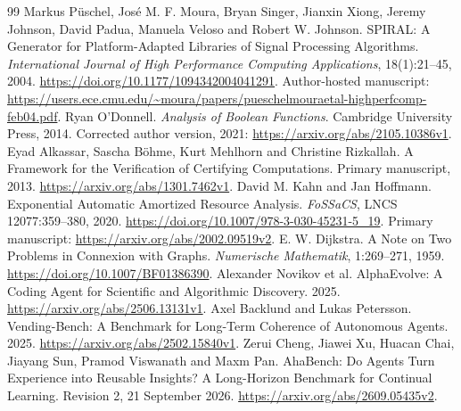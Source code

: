 \documentclass[11pt,letterpaper]{article}
\theoremstyle{definition}\newtheorem{definition}[theorem]{Definition}
\theoremstyle{remark}\newtheorem{remark}[theorem]{Remark}
\begin{document}
\begin{thebibliography}{99}
 Markus P\"uschel, Jos\'e M. F. Moura, Bryan Singer, Jianxin Xiong, Jeremy Johnson, David Padua, Manuela Veloso and Robert W. Johnson. SPIRAL: A Generator for Platform-Adapted Libraries of Signal Processing Algorithms. \emph{International Journal of High Performance Computing Applications}, 18(1):21--45, 2004. \url{https://doi.org/10.1177/1094342004041291}. Author-hosted manuscript: \url{https://users.ece.cmu.edu/~moura/papers/pueschelmouraetal-highperfcomp-feb04.pdf}.
 Ryan O'Donnell. \emph{Analysis of Boolean Functions}. Cambridge University Press, 2014. Corrected author version, 2021: \url{https://arxiv.org/abs/2105.10386v1}.
 Eyad Alkassar, Sascha B\"ohme, Kurt Mehlhorn and Christine Rizkallah. A Framework for the Verification of Certifying Computations. Primary manuscript, 2013. \url{https://arxiv.org/abs/1301.7462v1}.
 David M. Kahn and Jan Hoffmann. Exponential Automatic Amortized Resource Analysis. \emph{FoSSaCS}, LNCS 12077:359--380, 2020. \url{https://doi.org/10.1007/978-3-030-45231-5_19}. Primary manuscript: \url{https://arxiv.org/abs/2002.09519v2}.
 E. W. Dijkstra. A Note on Two Problems in Connexion with Graphs. \emph{Numerische Mathematik}, 1:269--271, 1959. \url{https://doi.org/10.1007/BF01386390}.
 Alexander Novikov et al. AlphaEvolve: A Coding Agent for Scientific and Algorithmic Discovery. 2025. \url{https://arxiv.org/abs/2506.13131v1}.
 Axel Backlund and Lukas Petersson. Vending-Bench: A Benchmark for Long-Term Coherence of Autonomous Agents. 2025. \url{https://arxiv.org/abs/2502.15840v1}.
 Zerui Cheng, Jiawei Xu, Huacan Chai, Jiayang Sun, Pramod Viswanath and Maxm Pan. AhaBench: Do Agents Turn Experience into Reusable Insights? A Long-Horizon Benchmark for Continual Learning. Revision 2, 21 September 2026. \url{https://arxiv.org/abs/2609.05435v2}.
\end{thebibliography}
\end{document}
